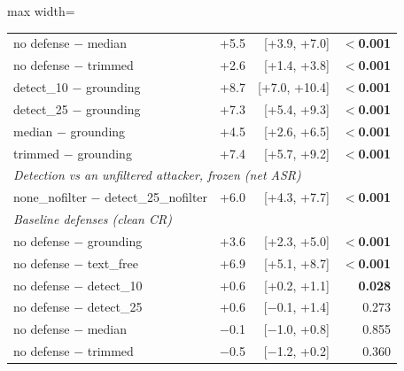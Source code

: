 \begin{table}[t]
{\begin{adjustbox}{max width=\linewidth}
\begin{tabular}{lrrr}
no defense $-$ median & +5.5 & [+3.9, +7.0] & \textbf{$<$0.001} \\
no defense $-$ trimmed & +2.6 & [+1.4, +3.8] & \textbf{$<$0.001} \\
detect\_10 $-$ grounding & +8.7 & [+7.0, +10.4] & \textbf{$<$0.001} \\
detect\_25 $-$ grounding & +7.3 & [+5.4, +9.3] & \textbf{$<$0.001} \\
median $-$ grounding & +4.5 & [+2.6, +6.5] & \textbf{$<$0.001} \\
trimmed $-$ grounding & +7.4 & [+5.7, +9.2] & \textbf{$<$0.001} \\
\midrule
\multicolumn{4}{l}{\textit{Detection vs an unfiltered attacker, frozen (net ASR)}} \\
none\_nofilter $-$ detect\_25\_nofilter & +6.0 & [+4.3, +7.7] & \textbf{$<$0.001} \\
\midrule
\multicolumn{4}{l}{\textit{Baseline defenses (clean CR)}} \\
no defense $-$ grounding & +3.6 & [+2.3, +5.0] & \textbf{$<$0.001} \\
no defense $-$ text\_free & +6.9 & [+5.1, +8.7] & \textbf{$<$0.001} \\
no defense $-$ detect\_10 & +0.6 & [+0.2, +1.1] & \textbf{0.028} \\
no defense $-$ detect\_25 & +0.6 & [$-$0.1, +1.4] & 0.273 \\
no defense $-$ median & $-$0.1 & [$-$1.0, +0.8] & 0.855 \\
no defense $-$ trimmed & $-$0.5 & [$-$1.2, +0.2] & 0.360 \\
\bottomrule
\end{tabular}
\end{adjustbox}
}
\end{table}